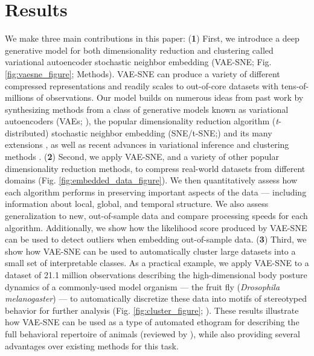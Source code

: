 \section{Results}
We make three main contributions in this paper: (\textbf{1}) First, we introduce a deep generative model for both dimensionality reduction and clustering called variational autoencoder stochastic neighbor embedding (VAE-SNE; Fig. \ref{fig:vaesne_figure}; Methods). VAE-SNE can produce a variety of different compressed representations and readily scales to out-of-core datasets with tens-of-millions of observations. Our model builds on numerous ideas from past work by synthesizing methods from a class of generative models known as variational autoencoders (VAEs; \citealt{kingma2013vae}), the popular dimensionality reduction algorithm (\textit{t}-distributed) stochastic neighbor embedding (SNE/t-SNE;\citealt{hinton2003stochastic, maaten2008tsne}) and its many extensions \citep{van2009ptsne, wang2016vmf, chien2017variational, ding2018scvis}, as well as recent advances in variational inference \citep{kingma2014semi, burda2015iwae, dilokthanakul2016gmvae, cremer2017reinterpreting, tomczak2017vae} and clustering methods \citep{todd2017systematic}. (\textbf{2}) Second, we apply VAE-SNE, and a variety of other popular dimensionality reduction methods, to compress real-world datasets from different domains (Fig. \ref{fig:embedded_data_figure}). We then quantitatively assess how each algorithm performs in preserving important aspects of the data --- including information about local, global, and temporal structure. We also assess generalization to new, out-of-sample data and compare processing speeds for each algorithm. Additionally, we show how the likelihood score produced by VAE-SNE can be used to detect outliers when embedding out-of-sample data. (\textbf{3}) Third, we show how VAE-SNE can be used to automatically cluster large datasets into a small set of interpretable classes. As a practical example, we apply VAE-SNE to a dataset of 21.1 million observations describing the high-dimensional body posture dynamics of a commonly-used model organism --- the fruit fly (\textit{Drosophila melanogaster}) --- to automatically discretize these data into motifs of stereotyped behavior for further analysis (Fig. \ref{fig:cluster_figure}; \citealt{berman2014mapping, pereira2019fast}). These results illustrate how VAE-SNE can be used as a type of automated ethogram for describing the full behavioral repertoire of animals (reviewed by \citealt{anderson2014toward, berman2018measuring, brown2018ethology, datta2019computational}), while also providing several advantages over existing methods for this task.


